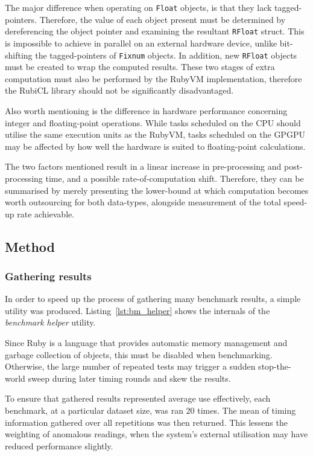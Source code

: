  The major difference when operating on \verb|Float| objects, is that they lack tagged-pointers. Therefore, the value of each object present must be determined by dereferencing the object pointer and examining the resultant \verb|RFloat| struct. This is impossible to achieve in parallel on an external hardware device, unlike bit-shifting the tagged-pointers of \verb|Fixnum| objects. In addition,  new \verb|RFloat| objects must be created to wrap the computed results.
 These two stages of extra computation must also be performed by the RubyVM implementation, therefore the RubiCL library should not be significantly disadvantaged.

 Also worth mentioning is the difference in hardware performance concerning integer and floating-point operations. While tasks scheduled on the \ac{CPU} should utilise the same execution units as the RubyVM, tasks scheduled on the \ac{GPGPU} may be affected by how well the hardware is suited to floating-point calculations.

 The two factors mentioned result in a linear increase in pre-processing and post-processing time, and a possible rate-of-computation shift. Therefore, they can be summarised by merely presenting the lower-bound at which computation becomes worth outsourcing for both data-types, alongside measurement of the total speed-up rate achievable.

\subsection{Method}
\subsubsection{Gathering results}
In order to speed up the process of gathering many benchmark results, a simple utility was produced. Listing~\ref{lst:bm_helper} shows the internals of the \emph{benchmark helper} utility.

Since Ruby is a language that provides automatic memory management and garbage collection of objects, this must be disabled when benchmarking. Otherwise, the large number of repeated tests may trigger a sudden stop-the-world sweep during later timing rounds and skew the results.

To ensure that gathered results represented average use effectively, each benchmark, at a particular dataset size,  was ran $20$ times. The mean of timing information gathered over all repetitions was then returned. This lessens the weighting of anomalous readings, when the system's external utilisation may have reduced performance slightly.


